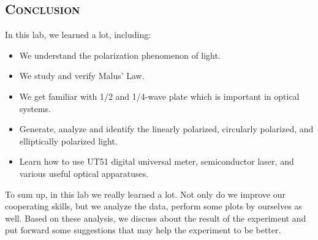 \documentclass[a4paper,12pt]{article}
\begin{document}
\subsection{\textsc{Conclusion}}
In this lab, we learned a lot, including:
\begin{itemize}
\item We understand the polarization phenomenon of light.
\item We study and verify Malus' Law.
\item We get familiar with 1/2 and 1/4-wave plate which is important in optical systems.
\item Generate, analyze and identify the linearly polarized, circularly polarized, and elliptically polarized light.
\item Learn how to use UT51 digital universal meter, semiconductor laser, and various useful optical apparatuses.
\end{itemize}
To sum up, in this lab we really learned a lot. Not only do we improve our cooperating skills, but we analyze the data, perform some plots by ourselves as well. Based on these analysis, we discuss about the result of the experiment and put forward some suggestions that may help the experiment to be better.
\end{document}

